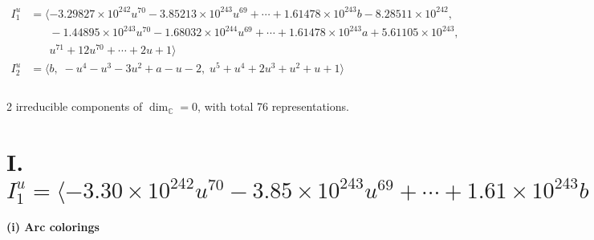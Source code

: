 \documentclass[1p]{elsarticle_modified}
\theoremstyle{definition}
\begin{document}
\begin{align*}
I^u_{1}&=\langle 
-3.29827\times10^{242} u^{70}-3.85213\times10^{243} u^{69}+\cdots+1.61478\times10^{243} b-8.28511\times10^{242},\\
\phantom{I^u_{1}}&\phantom{= \langle  }-1.44895\times10^{243} u^{70}-1.68032\times10^{244} u^{69}+\cdots+1.61478\times10^{243} a+5.61105\times10^{243},\\
\phantom{I^u_{1}}&\phantom{= \langle  }u^{71}+12 u^{70}+\cdots+2 u+1\rangle \\
I^u_{2}&=\langle 
b,\;- u^4- u^3-3 u^2+a- u-2,\;u^5+u^4+2 u^3+u^2+u+1\rangle \\
\\
\end{align*}
\raggedright * 2 irreducible components of $\dim_{\mathbb{C}}=0$, with total 76 representations.\\
\newpage
\renewcommand{\arraystretch}{1}
\centering \section*{I. $I^u_{1}= \langle -3.30\times10^{242} u^{70}-3.85\times10^{243} u^{69}+\cdots+1.61\times10^{243} b-8.29\times10^{242},\;-1.45\times10^{243} u^{70}-1.68\times10^{244} u^{69}+\cdots+1.61\times10^{243} a+5.61\times10^{243},\;u^{71}+12 u^{70}+\cdots+2 u+1 \rangle$}
\flushleft \textbf{(i) Arc colorings}\\
\end{document}

